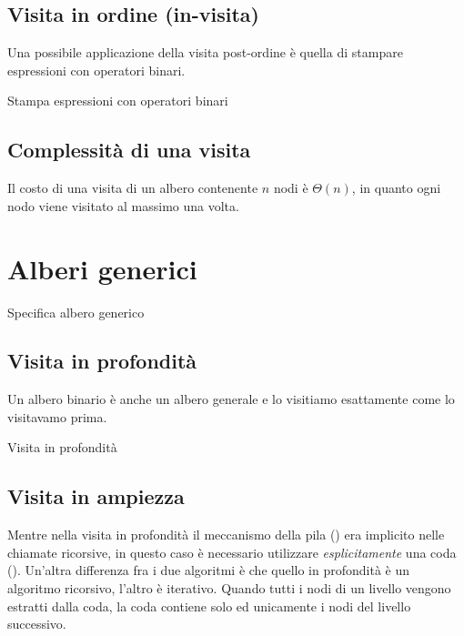 \subsection*{Visita in ordine (in-visita)}

Una possibile applicazione della visita post-ordine è quella di stampare espressioni con operatori binari.

\begin{algorithm}[H]
	\caption{Stampa espressioni con operatori binari}
	
\end{algorithm}


\subsection*{Complessità di una visita}

Il costo di una visita di un albero contenente \(n\) nodi è \(\Theta(n)\), in quanto ogni nodo viene visitato al massimo una volta.

\clearpage
\section{Alberi generici}

\begin{algorithm}[H]
	\caption{Specifica albero generico}
	
\end{algorithm}

\subsection{Visita in profondità}

Un albero binario è anche un albero generale e lo visitiamo esattamente come lo visitavamo prima.

\begin{algorithm}[H]
	\caption{Visita in profondità}
	
\end{algorithm}

\subsection{Visita in ampiezza}

Mentre nella visita in profondità il meccanismo della pila () era implicito nelle chiamate ricorsive, in questo caso è necessario utilizzare \emph{esplicitamente} una coda ().
Un'altra differenza fra i due algoritmi è che quello in profondità è un algoritmo ricorsivo, l'altro è iterativo.
Quando tutti i nodi di un livello vengono estratti dalla coda, la coda contiene solo ed unicamente i nodi del livello successivo.

